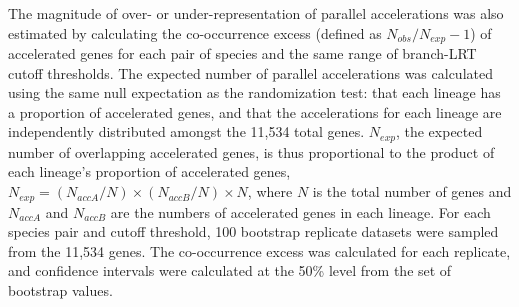 The magnitude of over- or under-representation of parallel
accelerations was also estimated by calculating the co-occurrence
excess (defined as $N_{obs}/N_{exp} - 1$) of accelerated genes for
each pair of species and the same range of branch-LRT cutoff
thresholds. The expected number of parallel accelerations was
calculated using the same null expectation as the randomization test:
that each lineage has a proportion of accelerated genes, and that the
accelerations for each lineage are independently distributed amongst
the 11,534 total genes. $N_{exp}$, the expected number of overlapping
accelerated genes, is thus proportional to the product of each
lineage's proportion of accelerated genes, $N_{exp}=(N_{accA}/N)
\times (N_{accB}/N) \times N$, where $N$ is the total number of genes
and $N_{accA}$ and $N_{accB}$ are the numbers of accelerated genes in
each lineage. For each species pair and cutoff threshold, 100
bootstrap replicate datasets were sampled from the 11,534 genes. The
co-occurrence excess was calculated for each replicate, and confidence
intervals were calculated at the 50\% level from the set of bootstrap
values.

